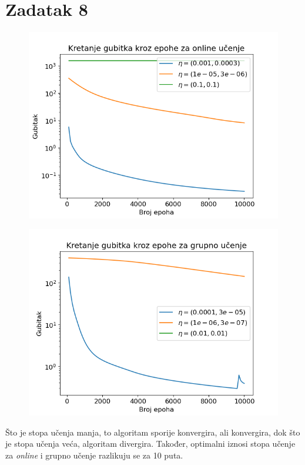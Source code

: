 \documentclass[times, utf8, seminar]{fer}
\begin{document}
\chapter{Zadatak 8}
\begin{figure}[H]
    \centering
    \includegraphics[scale=0.5]{img/stope-online.png}
    \caption{}
\end{figure}
\begin{figure}[H]
    \centering
    \includegraphics[scale=0.5]{img/stope-grupno.png}
    \caption{}
\end{figure}
Što je stopa učenja manja, to algoritam sporije konvergira, ali konvergira, dok što je stopa učenja veća, algoritam divergira. Također, optimalni iznosi stopa učenje za \textit{online} i grupno učenje razlikuju se za 10 puta.



\nocite{*}
\end{document}
